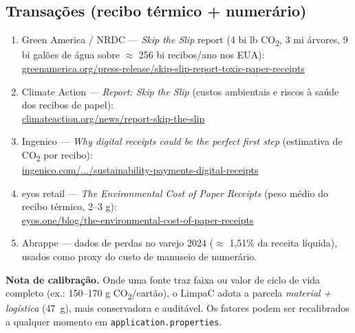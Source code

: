 \documentclass[11pt,a4paper]{article}
\begin{document}
\subsection{Transações (recibo térmico + numerário)}
\begin{enumerate}[leftmargin=1.6em]
\item Green America / NRDC --- \emph{Skip the Slip} report (4 bi lb
CO\textsubscript{2}, 3 mi árvores, 9 bi galões de água sobre $\approx$ 256 bi
recibos/ano nos EUA):\\
\href{https://greenamerica.org/press-release/skip-slip-report-toxic-paper-receipts-jeopardize-health}{greenamerica.org/press-release/skip-slip-report-toxic-paper-receipts}
\item Climate Action --- \emph{Report: Skip the Slip} (custos ambientais e
riscos à saúde dos recibos de papel):\\
\href{https://www.climateaction.org/news/report-skip-the-slip-environmental-costs-human-health-risks-of-paper-receip}{climateaction.org/news/report-skip-the-slip}
\item Ingenico --- \emph{Why digital receipts could be the perfect first step}
(estimativa de CO\textsubscript{2} por recibo):\\
\href{https://ingenico.com/en/newsroom/blogs/sustainability-payments-digital-receipts}{ingenico.com/.../sustainability-payments-digital-receipts}
\item eyos retail --- \emph{The Environmental Cost of Paper Receipts}
(peso médio do recibo térmico, 2--3 g):\\
\href{https://eyos.one/blog/the-environmental-cost-of-paper-receipts/}{eyos.one/blog/the-environmental-cost-of-paper-receipts}
\item Abrappe --- dados de perdas no varejo 2024 ($\approx$ 1,51\% da receita
líquida), usados como proxy do custo de manuseio de numerário.
\end{enumerate}

\begin{notebox}
\textbf{Nota de calibração.} Onde uma fonte traz faixa ou valor de ciclo de vida
completo (ex.: 150--170 g CO\textsubscript{2}/cartão), o LimpaC adota a parcela
\emph{material + logística} (\SI{47}{g}), mais conservadora e auditável. Os
fatores podem ser recalibrados a qualquer momento em \texttt{application.properties}.
\end{notebox}
\end{document}
